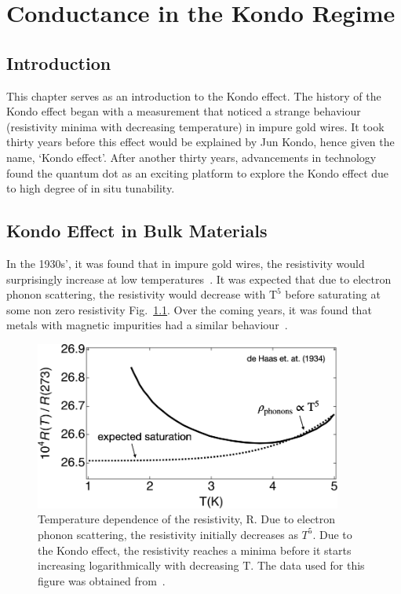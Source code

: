 \chapter{Conductance in the Kondo Regime}\label{cha:kondo_conductance}

\section{Introduction}
This chapter serves as an introduction to the Kondo effect. The history of the Kondo effect began with a measurement that noticed a strange behaviour (resistivity minima with decreasing temperature) in impure gold wires. It took thirty years before this effect would be explained by Jun Kondo, hence given the name, `Kondo effect'. After another thirty years, advancements in technology found the quantum dot as an exciting platform to explore the Kondo effect due to high degree of in situ tunability. 


\afterpage{\clearpage}
\section{Kondo Effect in Bulk Materials}


In the 1930s', it was found that in impure gold wires, the resistivity would surprisingly increase at low temperatures~\cite{de_haas}. It was expected that due to electron phonon scattering, the resistivity would decrease with $\mathrm{T^5}$ before saturating at some non zero resistivity Fig.~\ref{fig:ch2/kondo_bulkmetal}. Over the coming years, it was found that metals with magnetic impurities had a similar behaviour~\cite{still_irresistible}.


\begin{figure}[!hbt]
 \begin{center}
  \includegraphics[width=0.9\textwidth]{figures/ch2/crop_FiguresMaster.008.png}
  \caption[Kondo effect in bulk materials]{\label{fig:ch2/kondo_bulkmetal} 
  Temperature dependence of the resistivity, $\mathrm{R}$. Due to electron phonon scattering, the resistivity initially decreases as $T^5$. Due to the Kondo effect, the resistivity reaches a minima before it starts increasing logarithmically with decreasing $\mathrm{T}$. The data used for this figure was obtained from~\cite{de_haas}.
   }
 \end{center}
\end{figure}


